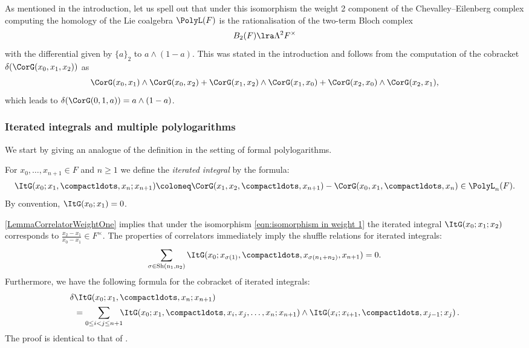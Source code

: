 \documentclass[a4paper]{amsart}
\begin{document}
\begin{example}As mentioned in the introduction, let us spell out that under this isomorphism the weight 2 component of the Chevalley--Eilenberg complex computing the homology of the Lie coalgebra $\PolyL(F)$ is the rationalisation of the two-term Bloch complex \cite{Sus90}
\[
B_2(F)\lra \Lambda^2 F^{\times}
\]
with the differential given by $\{a\}_2$ to $a\wedge (1-a)$. This was stated in the introduction and follows from the computation of the cobracket $\delta(\CorG(x_0, x_1,x_2))$ as
\[\CorG(x_0, x_1)\wedge \CorG(x_0, x_2)+\CorG(x_1, x_2)\wedge \CorG(x_1, x_0)+\CorG(x_2, x_0)\wedge \CorG(x_2, x_1),\]
which leads to $\delta(\CorG(0,1,a))=a\wedge (1-a)$.
\end{example}

\subsubsection{Iterated integrals and multiple polylogarithms}\label{sec:iterated-integrals-and-multiple-polylogarithms}
We start by giving an analogue of the definition \cite[Definition 16]{CMRR24} in the setting of formal polylogarithms.

\begin{definition}For $x_0,\dots,x_{n+1} \in F$ and $n\geq 1$ we define the \emph{iterated integral} by the formula:
\[
			\ItG(x_0; x_1,\compactldots,x_n; x_{n+1}) \coloneq  \CorG(x_1,x_2,\compactldots,x_{n+1}) - \CorG(x_0, x_1,\compactldots, x_n) \in \PolyL_n(F).
\]
By convention, $\ItG(x_0; x_1) = 0$.\end{definition}

\cref{LemmaCorrelatorWeightOne} implies that under the isomorphism \eqref{eqn:isomorphism in weight 1} the iterated integral $\ItG(x_0; x_1; x_{2})$ corresponds to $\tfrac{x_2-x_1}{x_0-x_1}\in F^{\times}$. The properties of correlators immediately imply the shuffle relations for iterated integrals: 
\[\sum_{\sigma \in \rm{Sh}(n_1,n_2)} \ItG(x_0;x_{\sigma(1)},\compactldots,x_{\sigma(n_1+n_2)},x_{n+1}) =0.\]
Furthermore, we have the following formula for the cobracket of iterated integrals:
\begin{align*}
\delta & \ItG(x_0; x_1,\compactldots,x_n; x_{n+1}) \\
&=\sum_{0 \leq i < j \leq n+1} \!\!\! \ItG(x_0; x_1,\compactldots,x_i, x_j,\ldots, x_n; x_{n+1}) \wedge \ItG(x_i; x_{i+1}, \compactldots, x_{j-1}; x_j)  \,.
\end{align*}
The proof is identical to that of \cite[Proposition 19]{CMRR24}.
\end{document}
